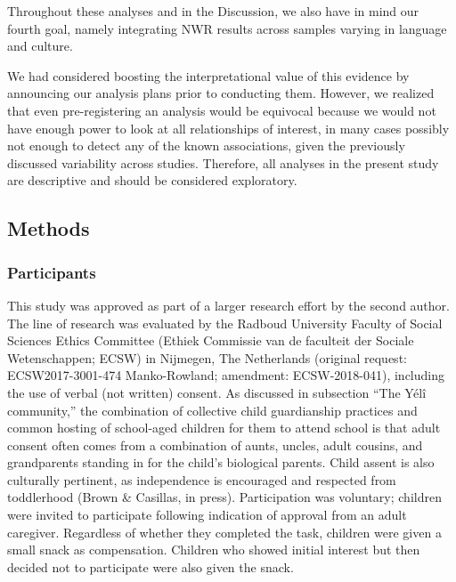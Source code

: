 \documentclass[
  american,
  ,man,floatsintext]{apa6}
\begin{document}
Throughout these analyses and in the Discussion, we also have in mind our fourth goal, namely integrating NWR results across samples varying in language and culture.

We had considered boosting the interpretational value of this evidence by announcing our analysis plans prior to conducting them. However, we realized that even pre-registering an analysis would be equivocal because we would not have enough power to look at all relationships of interest, in many cases possibly not enough to detect any of the known associations, given the previously discussed variability across studies. Therefore, all analyses in the present study are descriptive and should be considered exploratory.

\hypertarget{methods}{%
\subsection{Methods}\label{methods}}

\hypertarget{participants}{%
\subsubsection{Participants}\label{participants}}

This study was approved as part of a larger research effort by the second author. The line of research was evaluated by the Radboud University Faculty of Social Sciences Ethics Committee (Ethiek Commissie van de faculteit der Sociale Wetenschappen; ECSW) in Nijmegen, The Netherlands (original request: ECSW2017-3001-474 Manko-Rowland; amendment: ECSW-2018-041), including the use of verbal (not written) consent. As discussed in subsection ``The Yélî community,'' the combination of collective child guardianship practices and common hosting of school-aged children for them to attend school is that adult consent often comes from a combination of aunts, uncles, adult cousins, and grandparents standing in for the child's biological parents. Child assent is also culturally pertinent, as independence is encouraged and respected from toddlerhood (Brown \& Casillas, in press). Participation was voluntary; children were invited to participate following indication of approval from an adult caregiver. Regardless of whether they completed the task, children were given a small snack as compensation. Children who showed initial interest but then decided not to participate were also given the snack.
\end{document}
